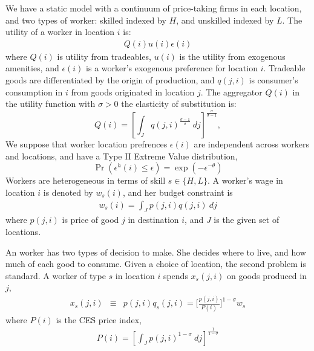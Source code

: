 \documentclass{article}
\begin{document}
We have a static model with a continuum of price-taking firms in each location, and two types of worker: skilled indexed by $H$, and unskilled indexed by $L$.  The utility of a worker in location $i$ is:
\begin{eqnarray}\label{eq:utility}
	Q(i) u(i) \epsilon(i)
\end{eqnarray} 
where $Q(i)$ is utility from tradeables, $u(i)$ is the utility from exogenous amenities, and $\epsilon(i)$ is a worker's exogenous preference for location $i$.  Tradeable goods are differentiated by the origin of production, and $q(j,i)$ is consumer's consumption in $i$ from goods originated in location $j$. The aggregator $Q(i)$ in the utility function with $\sigma>0$ the elasticity of substitution is:
\[
	Q(i) = \left[\int_J q(j,i)^{\frac{ \sigma - 1}{\sigma}}~ dj\right]^{\frac{\sigma}{\sigma-1}},
\]
We suppose that worker location prefrences $\epsilon(i)$ are independent across workers and locations, and have a Type II Extreme Value distribution,
\[
\Pr(\epsilon^h(i) \leq \epsilon) = \exp(-\epsilon^{-\theta})
\]
Workers are heterogeneous in terms of skill $s \in \{H,L\}$. A worker's wage in location $i$ is denoted by $w_s(i)$, and her budget constraint is 
\begin{eqnarray}\label{eq:budget}
	w_s(i) = \int_J p(j,i)q(j,i)~dj 
\end{eqnarray}
where $p(j,i)$ is price of good $j$ in destination $i$, and $J$ is the given set of locations.

An worker has two types of decision to make.  She decides where to live, and how much of each good to consume.  Given a choice of location, the second problem is standard.  A worker of type $s$ in location $i$ spends $x_s(j,i)$ on goods produced in $j$,
\begin{eqnarray}\label{eq:x_s}
	x_s(j,i) & \equiv & p(j,i) q_s(j,i) = \Big[ \frac{p(j,i)}{P(i)} \Big]^{1-\sigma} w_s
\end{eqnarray}
where $P(i)$ is the CES price index,
\begin{eqnarray}\label{eq:price_index}
	P(i) = \left[\int_J p(j,i)^{1-\sigma}~ dj\right]^{\frac{1}{1-\sigma}}
\end{eqnarray}
\end{document}

